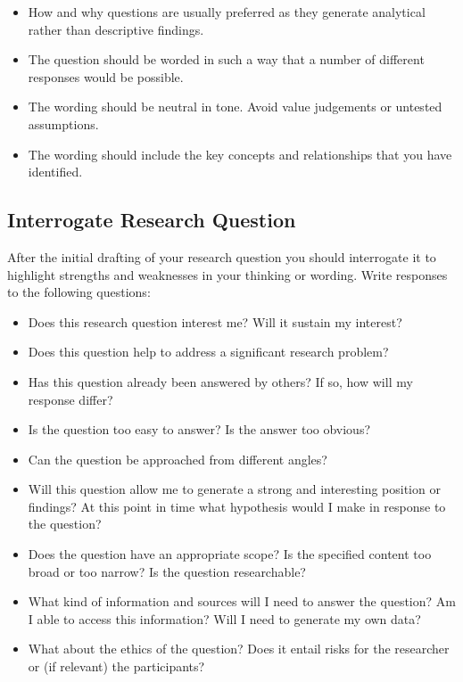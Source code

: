 \documentclass[12pt, a4paper]{article}
\begin{document}
\begin{itemize}
\item How and why questions are usually preferred as they generate analytical rather than descriptive findings.
\item The question should be worded in such a way that a number of different responses would be possible.
\item The wording should be neutral in tone. Avoid value judgements or untested assumptions.
\item The wording should include the key concepts and relationships that you have identified.
\end{itemize}

\subsection{Interrogate Research Question}
After the initial drafting of your research question you should interrogate it to highlight strengths and weaknesses in your thinking or wording. Write responses to the following questions: 

\begin{itemize}
\item Does this research question interest me? Will it sustain my interest?
\item Does this question help to address a significant research problem?
\item Has this question already been answered by others? If so, how will my response differ?
\item Is the question too easy to answer? Is the answer too obvious? 
\item Can the question be approached from different angles? 
\item Will this question allow me to generate a strong and interesting position or findings? At this point in time what hypothesis would I make in response to the question?
\item Does the question have an appropriate scope? Is the specified content too broad or too narrow? 
Is the question researchable? 
\item What kind of information and sources will I need to answer the question?  Am I able to access this information? Will I need to generate my own data?  
\item What about the ethics of the question? Does it entail risks for the researcher or (if relevant) the participants? 
\end{itemize}
\end{document}
